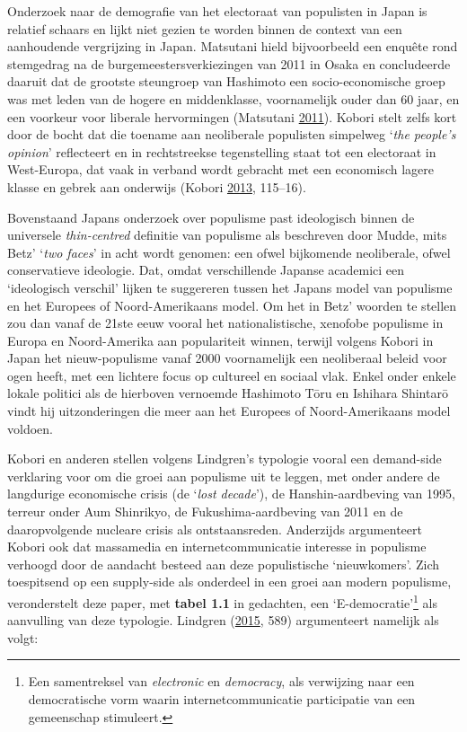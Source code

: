 \documentclass[10.5pt,dutch,]{article}
\begin{document}
Onderzoek naar de demografie van het electoraat van populisten in Japan
is relatief schaars en lijkt niet gezien te worden binnen de context van
een aanhoudende vergrijzing in Japan. Matsutani hield bijvoorbeeld een
enquête rond stemgedrag na de burgemeestersverkiezingen van 2011 in
Osaka en concludeerde daaruit dat de grootste steungroep van Hashimoto
een socio-economische groep was met leden van de hogere en middenklasse,
voornamelijk ouder dan 60 jaar, en een voorkeur voor liberale
hervormingen (Matsutani
\protect\hyperlink{ref-matsutaniux5fpopyurizumuux5f2011}{2011}). Kobori
stelt zelfs kort door de bocht dat die toename aan neoliberale
populisten simpelweg `\emph{the people's opinion}' reflecteert en in
rechtstreekse tegenstelling staat tot een electoraat in West-Europa, dat
vaak in verband wordt gebracht met een economisch lagere klasse en
gebrek aan onderwijs (Kobori
\protect\hyperlink{ref-koboriux5fpopulismux5f2013}{2013}, 115--16).

Bovenstaand Japans onderzoek over populisme past ideologisch binnen de
universele \emph{thin-centred} definitie van populisme als beschreven
door Mudde, mits Betz' `\emph{two faces}' in acht wordt genomen: een
ofwel bijkomende neoliberale, ofwel conservatieve ideologie. Dat, omdat
verschillende Japanse academici een `ideologisch verschil' lijken te
suggereren tussen het Japans model van populisme en het Europees of
Noord-Amerikaans model. Om het in Betz' woorden te stellen zou dan vanaf
de 21ste eeuw vooral het nationalistische, xenofobe populisme in Europa
en Noord-Amerika aan populariteit winnen, terwijl volgens Kobori in
Japan het nieuw-populisme vanaf 2000 voornamelijk een neoliberaal beleid
voor ogen heeft, met een lichtere focus op cultureel en sociaal vlak.
Enkel onder enkele lokale politici als de hierboven vernoemde Hashimoto
Tōru en Ishihara Shintarō vindt hij uitzonderingen die meer aan het
Europees of Noord-Amerikaans model voldoen.

Kobori en anderen stellen volgens Lindgren's typologie vooral een
demand-side verklaring voor om die groei aan populisme uit te leggen,
met onder andere de langdurige economische crisis (de `\emph{lost
decade}'), de Hanshin-aardbeving van 1995, terreur onder Aum Shinrikyo,
de Fukushima-aardbeving van 2011 en de daaropvolgende nucleare crisis
als ontstaansreden. Anderzijds argumenteert Kobori ook dat massamedia en
internetcommunicatie interesse in populisme verhoogd door de aandacht
besteed aan deze populistische `nieuwkomers'. Zich toespitsend op een
supply-side als onderdeel in een groei aan modern populisme,
veronderstelt deze paper, met \textbf{tabel 1.1} in gedachten, een
`E-democratie'\footnote{Een samentreksel van \emph{electronic} en
  \emph{democracy}, als verwijzing naar een democratische vorm waarin
  internetcommunicatie participatie van een gemeenschap stimuleert.} als
aanvulling van deze typologie. Lindgren
(\protect\hyperlink{ref-lindgrenux5fdevelopingux5f2015}{2015}, 589)
argumenteert namelijk als volgt:
\end{document}
